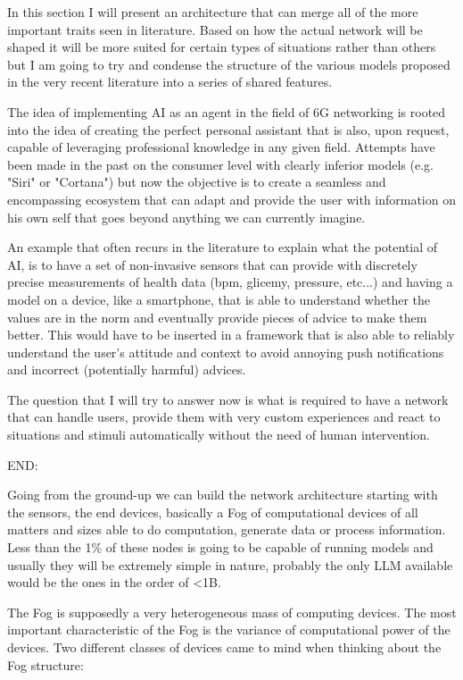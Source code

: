 

In this section I will present an architecture that can merge all of the more important traits seen
in literature. Based on how the actual network will be shaped it will be more suited for certain
types of situations rather than others but I am going to try and condense the structure of the various models proposed in the very recent literature into a series of shared features.

The idea of implementing AI as an agent in the field of 6G networking is rooted into the idea of
creating the perfect personal assistant that is also, upon request, capable of leveraging
professional knowledge in any given field. Attempts have been made in the past on the consumer level with clearly inferior models (e.g. "Siri" or "Cortana") but now the objective is to create a seamless and encompassing ecosystem that can adapt and provide the user with information on his own self that goes beyond anything we can currently imagine.

An example that often recurs in the literature to explain what the potential of AI, is to have a set of non-invasive sensors that can provide with discretely precise measurements of health data (bpm,
glicemy, pressure, etc...) and having a model on a device, like a smartphone, that is able to understand
whether the values are in the norm and eventually provide pieces of advice to make them better. This would have to be inserted in a framework that is also able to reliably understand the user's attitude and
context to avoid annoying push notifications and incorrect (potentially harmful) advices.

The question that I will try to answer now is what is required to have a network that can handle
users, provide them with very custom experiences and react to situations and stimuli automatically
without the need of human intervention.

\bigskip
\noindent
END:
\label{ssec:end}

Going from the ground-up we can build the network architecture starting with the sensors, the end
devices, basically a Fog of computational devices of all matters and sizes able to do
computation, generate data or process information. Less than the 1\% of these nodes is going to be
capable of running models and usually they will be extremely simple in nature, probably the only LLM
available would be the ones in the order of <1B.

The Fog is supposedly a very heterogeneous mass of computing devices. The most important
characteristic of the Fog is the variance of computational power of the
devices. Two different classes of devices came to mind when thinking about the Fog structure:

